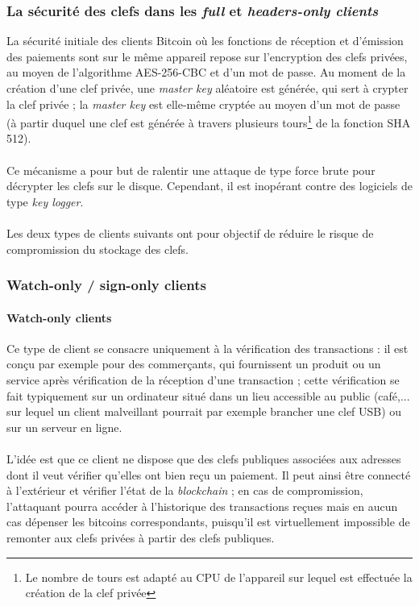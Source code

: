 \documentclass[11pt,a4paper]{article}
\begin{document}
\subsubsection{La sécurité des clefs dans les \textit{full} et \textit{headers-only clients}}
La sécurité initiale des clients Bitcoin où les fonctions de réception et d'émission des paiements sont sur le même appareil repose sur l'encryption des clefs privées, au moyen de l'algorithme AES-256-CBC et d'un mot de passe. Au moment de la création d'une clef privée, une \textit{master key} aléatoire est générée, qui sert à crypter la clef privée ; la \textit{master key} est elle-même cryptée au moyen d'un mot de passe (à partir duquel une clef est générée à travers plusieurs tours\footnote{Le nombre de tours est adapté au CPU de l'appareil sur lequel est effectuée la création de la clef privée} de la fonction SHA 512).\\\\
Ce mécanisme a pour but de ralentir une attaque de type force brute pour décrypter les clefs sur le disque. Cependant, il est inopérant contre des logiciels de type \textit{key logger}.\\\\
Les deux types de clients suivants ont pour objectif de réduire le risque de compromission du stockage des clefs.
\subsubsection{Watch-only / sign-only clients}
\paragraph{Watch-only clients}
Ce type de client se consacre uniquement à la vérification des transactions : il est conçu par exemple pour des commerçants, qui fournissent un produit ou un service après vérification de la réception d'une transaction ; cette vérification se fait typiquement sur un ordinateur situé dans un lieu accessible au public (café,... sur lequel un client malveillant pourrait par exemple brancher une clef USB) ou sur un serveur en ligne.\\\\
L'idée est que ce client ne dispose que des clefs publiques associées aux adresses dont il veut vérifier qu'elles ont bien reçu un paiement. Il peut ainsi être connecté à l'extérieur et vérifier l'état de la \textit{blockchain} ; en cas de compromission, l'attaquant pourra accéder à l'historique des transactions reçues mais en aucun cas dépenser les bitcoins correspondants, puisqu'il est virtuellement impossible de remonter aux clefs privées à partir des clefs publiques.
\end{document}
